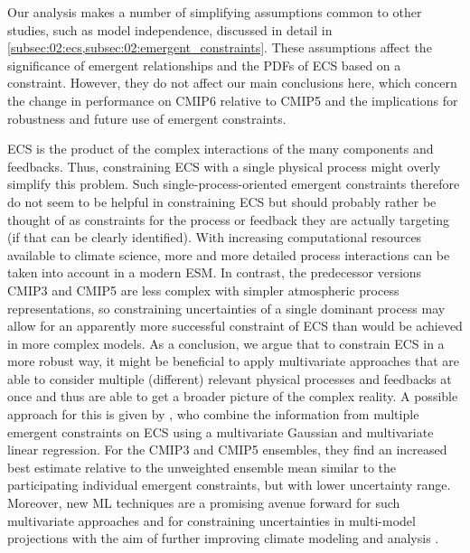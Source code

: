 Our analysis makes a number of simplifying assumptions common to other studies,
such as model independence, discussed in detail in
\cref{subsec:02:ecs,subsec:02:emergent_constraints}. These assumptions affect
the significance of emergent relationships and the \acp{PDF} of \ac{ECS} based
on a constraint. However, they do not affect our main conclusions here, which
concern the change in performance on \acs{CMIP}6 relative to \acs{CMIP}5 and
the implications for robustness and future use of emergent constraints.

\Ac{ECS} is the product of the complex interactions of the many components and
feedbacks. Thus, constraining \ac{ECS} with a single physical process might
overly simplify this problem. Such single-process-oriented emergent constraints
therefore do not seem to be helpful in constraining \ac{ECS} but should
probably rather be thought of as constraints for the process or feedback they
are actually targeting (if that can be clearly identified). With increasing
computational resources available to climate science, more and more detailed
process interactions can be taken into account in a modern \ac{ESM}. In
contrast, the predecessor versions \acs{CMIP}3 and \acs{CMIP}5 are less complex
with simpler atmospheric process representations, so constraining uncertainties
of a single dominant process may allow for an apparently more successful
constraint of \ac{ECS} than would be achieved in more complex models. As a
conclusion, we argue that to constrain \ac{ECS} in a more robust way, it might
be beneficial to apply multivariate approaches that are able to consider
multiple (different) relevant physical processes and feedbacks at once and thus
are able to get a broader picture of the complex reality. A possible approach
for this is given by \textcite{Bretherton2020}, who combine the information
from multiple emergent constraints on \ac{ECS} using a multivariate Gaussian
and multivariate linear regression. For the \acs{CMIP}3 and \acs{CMIP}5
ensembles, they find an increased best estimate relative to the unweighted
ensemble mean similar to the participating individual emergent constraints, but
with lower uncertainty range. Moreover, new \ac{ML} techniques are a promising
avenue forward for such multivariate approaches and for constraining
uncertainties in multi-model projections  with the aim of further improving climate modeling
and analysis \autocite{Reichstein2019}.
